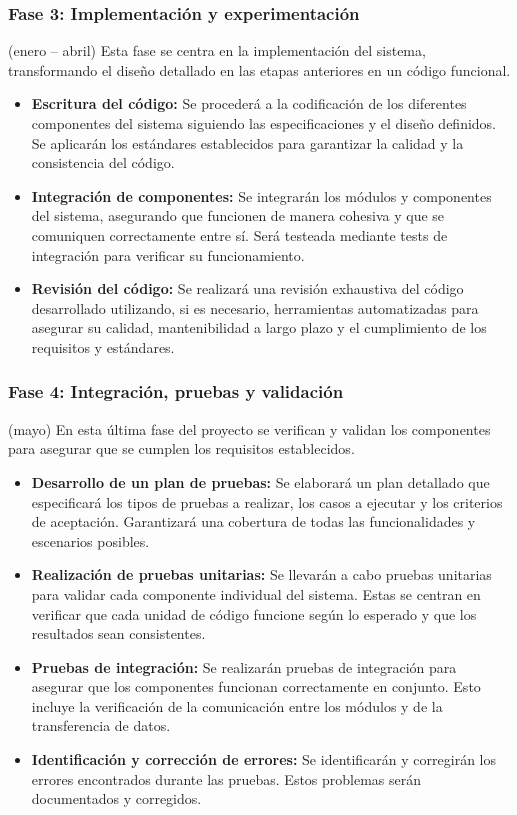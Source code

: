 \subsubsection{Fase 3: Implementación y experimentación} (enero – abril)
Esta fase se centra en la implementación del sistema, transformando el diseño detallado en las etapas anteriores en un código funcional.
\begin{itemize}
    \item \textbf{Escritura del código:} Se procederá a la codificación de los diferentes componentes del sistema siguiendo las especificaciones y el diseño definidos. Se aplicarán los estándares establecidos para garantizar la calidad y la consistencia del código.
    \item \textbf{Integración de componentes:} Se integrarán los módulos y componentes del sistema, asegurando que funcionen de manera cohesiva y que se comuniquen correctamente entre sí. Será testeada mediante tests de integración para verificar su funcionamiento.
    \item \textbf{Revisión del código:} Se realizará una revisión exhaustiva del código desarrollado utilizando, si es necesario, herramientas automatizadas para asegurar su calidad, mantenibilidad a largo plazo y el cumplimiento de los requisitos y estándares.
\end{itemize}

\subsubsection{Fase 4: Integración, pruebas y validación} (mayo)
En esta última fase del proyecto se verifican y validan los componentes para asegurar que se cumplen los requisitos establecidos.
\begin{itemize}
    \item \textbf{Desarrollo de un plan de pruebas:} Se elaborará un plan detallado que especificará los tipos de pruebas a realizar, los casos a ejecutar y los criterios de aceptación. Garantizará una cobertura de todas las funcionalidades y escenarios posibles.
    \item \textbf{Realización de pruebas unitarias:} Se llevarán a cabo pruebas unitarias para validar cada componente individual del sistema. Estas se centran en verificar que cada unidad de código funcione según lo esperado y que los resultados sean consistentes.
    \item \textbf{Pruebas de integración:} Se realizarán pruebas de integración para asegurar que los componentes funcionan correctamente en conjunto. Esto incluye la verificación de la comunicación entre los módulos y de la transferencia de datos.
    \item \textbf{Identificación y corrección de errores:} Se identificarán y corregirán los errores encontrados durante las pruebas. Estos problemas serán documentados y corregidos.
\end{itemize}

